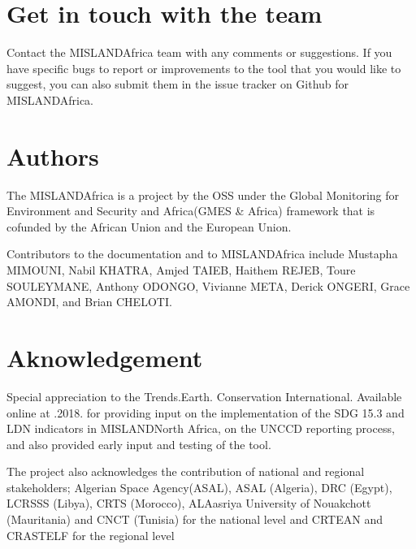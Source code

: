 \documentclass[letterpaper,10pt,english]{sphinxmanual}
\let\sphinxpxdimen\pdfpxdimen\else\newdimen\sphinxpxdimen
\begin{document}
\section{Get in touch with the team}
\label{\detokenize{Introduction/general_information:get-in-touch-with-the-team}}
\sphinxAtStartPar
Contact the MISLAND\sphinxhyphen{}Africa team with any comments or suggestions. If you have specific bugs to report or improvements to the tool that you would like to suggest, you can also submit them in the issue tracker on Github for MISLAND\sphinxhyphen{}Africa.


\section{Authors}
\label{\detokenize{Introduction/general_information:authors}}
\sphinxAtStartPar
The MISLAND\sphinxhyphen{}Africa is a project by the OSS under the Global Monitoring for Environment and Security and Africa(GMES \& Africa) framework that is co\sphinxhyphen{}funded by the African Union and the European Union.

\sphinxAtStartPar
Contributors to the documentation and to MISLAND\sphinxhyphen{}Africa include Mustapha MIMOUNI, Nabil KHATRA, Amjed TAIEB, Haithem REJEB, Toure SOULEYMANE, Anthony ODONGO, Vivianne META, Derick ONGERI, Grace AMONDI, and Brian CHELOTI.
\begin{quote}

\noindent{\hspace*{\fill}\sphinxincludegraphics[width=550\sphinxpxdimen,height=94\sphinxpxdimen]{{partners}.png}\hspace*{\fill}}
\end{quote}


\section{Aknowledgement}
\label{\detokenize{Introduction/general_information:aknowledgement}}
\sphinxAtStartPar
Special appreciation to the Trends.Earth. Conservation International. Available online at 
.2018. for providing input on the implementation of the SDG 15.3 and LDN indicators in MISLAND\sphinxhyphen{}North Africa, on the UNCCD reporting process, and also provided early input and testing of the tool.

\sphinxAtStartPar
The project also acknowledges the contribution of national and regional stakeholders; Algerian Space Agency(ASAL), ASAL (Algeria), DRC (Egypt), LCRSSS (Libya), CRTS (Morocco), AL\sphinxhyphen{}Aasriya University of Nouakchott (Mauritania) and CNCT (Tunisia) for the national level and CRTEAN and CRASTE\sphinxhyphen{}LF for the regional level
\end{document}
